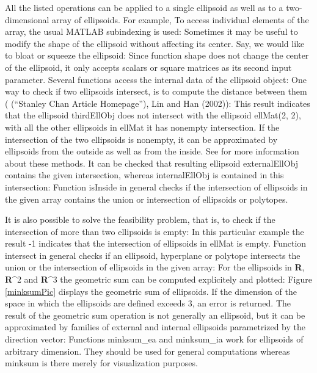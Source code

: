 \documentclass[letterpaper,10pt,english]{sphinxmanual}
\begin{document}
All the listed operations can be applied to a single ellipsoid as well
as to a two-dimensional array of ellipsoids. For example, To access
individual elements of the array, the usual MATLAB subindexing is used:
Sometimes it may be useful to modify the shape of the ellipsoid without
affecting its center. Say, we would like to bloat or squeeze the
ellipsoid: Since function shape does not change the center of the
ellipsoid, it only accepts scalars or square matrices as its second
input parameter. Several functions access the internal data of the
ellipsoid object: One way to check if two ellipsoids intersect, is to
compute the distance between them ( (“Stanley Chan Article Homepage”),
Lin and Han (2002)): This result indicates that the ellipsoid
thirdEllObj does not intersect with the ellipsoid ellMat(2, 2), with all
the other ellipsoids in ellMat it has nonempty intersection. If the
intersection of the two ellipsoids is nonempty, it can be approximated
by ellipsoids from the outside as well as from the inside. See
\mbox{\!\!}
for more information about these methods. It can be checked that
resulting ellipsoid externalEllObj contains the given intersection,
whereas internalEllObj is contained in this intersection: Function
isInside in general checks if the intersection of ellipsoids in the
given array contains the union or intersection of ellipsoids or
polytopes.

It is also possible to solve the feasibility problem, that is, to check
if the intersection of more than two ellipsoids is empty: In this
particular example the result -1 indicates that the intersection
of ellipsoids in ellMat is empty. Function intersect in general checks
if an ellipsoid, hyperplane or polytope intersects the union or the
intersection of ellipsoids in the given array: For the ellipsoids in
{\bf R}, {\bf R}^2 and {\bf R}^3 the geometric
sum can be computed explicitely and plotted: Figure
\ref{minksumPic} displays the geometric sum of ellipsoids. If
the dimension of the space in which the ellipsoids are defined exceeds
3, an error is returned. The result of the geometric sum
operation is not generally an ellipsoid, but it can be approximated by
families of external and internal ellipsoids parametrized by the
direction vector: Functions minksum\_ea and minksum\_ia work for
ellipsoids of arbitrary dimension. They should be used for general
computations whereas minksum is there merely for visualization purposes.
\end{document}
